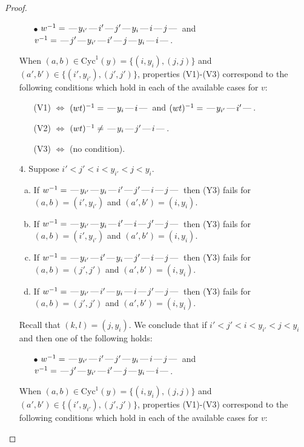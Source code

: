 \documentclass[10pt]{article}
\theoremstyle{definition}
\theoremstyle{definition}
\def\dash{\text{\hspace{0.5mm}---\hspace{0.5mm}}}
\def\Cyc{\mathrm{Cyc}}
\begin{document}
\begin{proof}
\begin{enumerate}
\begin{enumerate}
\item[$\bullet$] $w^{-1} = \dash y_{i'}\dash i'\dash j'\dash y_i\dash i\dash j\dash $ and $v^{-1} = \dash j'\dash y_{i'}\dash i'\dash j\dash y_i\dash i\dash $.
\end{enumerate}
When $(a,b)\in\Cyc^1(y)=\{(i,y_i),(j,j)\}$ and $(a',b')\in\{(i',y_{i'}),(j',j')\}$,
properties (V1)-(V3) correspond to the following conditions which hold in
each of the available cases for $v$:
\begin{enumerate}
\item[](V1) $\Leftrightarrow$ $(wt)^{-1} = \dash y_i \dash i \dash$  and $(wt)^{-1} = \dash y_{i'} \dash i' \dash$.
\item[](V2) $\Leftrightarrow$ $(wt)^{-1} \neq \dash y_i \dash j' \dash i \dash$.
\item[](V3) $\Leftrightarrow$ (no condition).
\end{enumerate}
\item[$4$.] Suppose $i' < j' < i < y_{i'} < j < y_i$.
\begin{enumerate}[(a)]
\item If $w^{-1} = \dash y_{i'}\dash y_i\dash i'\dash j'\dash i\dash j\dash $ then (Y3) fails for $(a,b)=(i',y_{i'})$ and $(a',b')=(i,y_i)$.
\item If $w^{-1} = \dash y_{i'}\dash y_i\dash i'\dash i\dash j'\dash j\dash $ then (Y3) fails for $(a,b)=(i',y_{i'})$ and $(a',b')=(i,y_i)$.
\item If $w^{-1} = \dash y_{i'}\dash i'\dash y_i\dash j'\dash i\dash j\dash $ then (Y3) fails for $(a,b)=(j',j')$ and $(a',b')=(i,y_i)$.
\item If $w^{-1} = \dash y_{i'}\dash i'\dash y_i\dash i\dash j'\dash j\dash $ then (Y3) fails for $(a,b)=(j',j')$ and $(a',b')=(i,y_i)$.
\end{enumerate}
Recall that $(k,l) = (j,y_i)$.
We conclude that if $i' < j' < i < y_{i'} < j < y_i$ and then one of the following holds:
\begin{enumerate}
\item[$\bullet$] $w^{-1} = \dash y_{i'}\dash i'\dash j'\dash y_i\dash i\dash j\dash $ and $v^{-1} = \dash j'\dash y_{i'}\dash i'\dash j\dash y_i\dash i\dash $.
\end{enumerate}
When $(a,b)\in\Cyc^1(y)=\{(i,y_i),(j,j)\}$ and $(a',b')\in\{(i',y_{i'}),(j',j')\}$,
properties (V1)-(V3) correspond to the following conditions which hold in
each of the available cases for $v$:
\begin{enumerate}

\end{enumerate}
\end{enumerate}
\end{proof}
\end{document}
